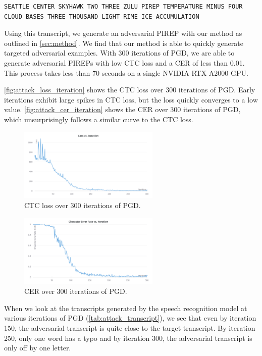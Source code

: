 \documentclass[11pt,a4paper]{article}
\begin{document}
\begin{lstlisting}[breaklines]
  SEATTLE CENTER SKYHAWK TWO THREE ZULU PIREP TEMPERATURE MINUS FOUR CLOUD BASES THREE THOUSAND LIGHT RIME ICE ACCUMULATION
\end{lstlisting}

Using this transcript, we generate an adversarial PIREP with our method as
outlined in \autoref{sec:method}. We find that our method is able to quickly
generate targeted adversarial examples. With 300 iterations of PGD, we are able
to generate adversarial PIREPs with low CTC loss and a CER of less than 0.01.
This process takes less than 70 seconds on a single NVIDIA RTX A2000 GPU.

\autoref{fig:attack_loss_iteration} shows the CTC loss over 300 iterations of
PGD. Early iterations exhibit large spikes in CTC loss, but the loss quickly
converges to a low value. \autoref{fig:attack_cer_iteration} shows the CER over
300 iterations of PGD, which unsurprisingly follows a similar curve to the CTC
loss.

\begin{figure}
  \centering
  \includegraphics[width=0.6\textwidth]{images/attack_loss_iteration.png}
  \caption{CTC loss over 300 iterations of PGD.}
  \label{fig:attack_loss_iteration}
\end{figure}

\begin{figure}
  \centering
  \includegraphics[width=0.6\textwidth]{images/attack_cer_iteration.png}
  \caption{CER over 300 iterations of PGD.}
  \label{fig:attack_cer_iteration}
\end{figure}

When we look at the transcripts generated by the speech recognition model at
various iterations of PGD (\autoref{tab:attack_transcript}), we see that even by
iteration 150, the adversarial transcript is quite close to the target
transcript. By iteration 250, only one word has a typo and by iteration 300, the
adversarial transcript is only off by one letter.
\end{document}
